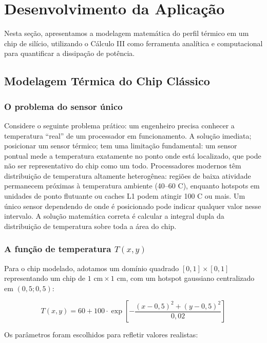 \section{Desenvolvimento da Aplicação}

Nesta seção, apresentamos a modelagem matemática do perfil térmico em um chip de silício, utilizando o Cálculo III como ferramenta analítica e computacional para quantificar a dissipação de potência.

\subsection{Modelagem Térmica do Chip Clássico}
\subsubsection{O problema do sensor único}
Considere o seguinte problema prático: um engenheiro precisa conhecer a temperatura ``real'' de um processador em funcionamento. A solução imediata; posicionar um sensor térmico; tem uma limitação fundamental: um sensor pontual mede a temperatura exatamente no ponto onde está localizado, que pode não ser representativo do chip como um todo.
Processadores modernos têm distribuição de temperatura altamente heterogênea: regiões de baixa atividade permanecem próximas à temperatura ambiente (40--60 \textdegree C), enquanto hotspots em unidades de ponto flutuante ou caches L1 podem atingir 100 \textdegree C ou mais. Um único sensor dependendo de onde é posicionado pode indicar qualquer valor nesse intervalo.
A solução matemática correta é calcular a integral dupla da distribuição de temperatura sobre toda a área do chip.
\subsubsection{A função de temperatura $T(x, y)$}
Para o chip modelado, adotamos um domínio quadrado $[0,1] \times [0,1]$ representando um chip de $1 \text{ cm} \times 1 \text{ cm}$, com um hotspot gaussiano centralizado em $(0,5; 0,5)$:

\begin{caixamath}
    \begin{equation}
        T(x, y) = 60 + 100 \cdot \exp\left[ -\frac{(x - 0,5)^2 + (y - 0,5)^2}{0,02} \right]
    \end{equation}
\end{caixamath}


Os parâmetros foram escolhidos para refletir valores realistas:

